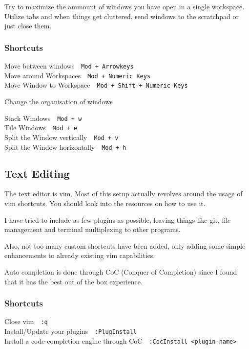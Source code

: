 \documentclass{article}
\newcommand{\ttt}[1]{\texttt{#1}}
\newcommand{\shortcut}[2]{#1~\dotfill{}~\ttt{#2}\\} %
\newcommand{\editor}{vim}
\newcommand{\shortcuttitle}[1]{\underline{#1}}
\begin{document}
Try to maximize the ammount of windows you have open in a single 
workspace. Utilize tabs and when things get cluttered, send 
windows to the scratchpad or just close them.

\subsubsection{Shortcuts}

\begin{minipage}{\textwidth}

\shortcut{Move between windows}{Mod + Arrowkeys}
\shortcut{Move around Workspaces}{Mod + Numeric Keys}
\shortcut{Move Window to Workspace}{Mod + Shift + Numeric Keys}

\end{minipage}

\begin{minipage}{\textwidth}
    \shortcuttitle{Change the organisation of windows}
    \newline

    \shortcut{Stack Windows}{Mod + w}
    \shortcut{Tile Windows}{Mod + e}

    \shortcut{Split the Window vertically}{Mod + v}
    \shortcut{Split the Window horizontally}{Mod + h}
\end{minipage}

\subsection{Text Editing}

The text editor is \editor. Most of this setup actually 
revolves around the usage of \editor{} shortcuts. You should 
look into the resources on how to use it. 

I have tried to include as few plugins as possible, leaving
things like git, file management and terminal multiplexing to other programs. 

Also, not too many custom shortcuts have been added, only adding 
some simple enhancements to already existing vim capabilities.

Auto completion is done through CoC (Conquer of Completion) since I found that it has 
the best out of the box experience.

\subsubsection{Shortcuts}

\shortcut{Close \editor}{:q}
\shortcut{Install/Update your plugins}{:PlugInstall}
\shortcut{Install a code-completion engine through CoC}{:CocInstall \textless plugin-name\textgreater}
\end{document}
